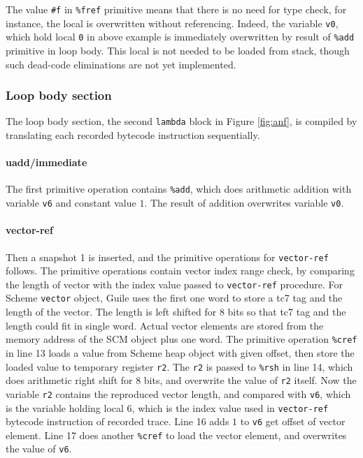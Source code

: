 \documentclass[preprint, 10pt]{sigplanconf}
\begin{document}
The value \texttt{\#f} in \texttt{\%fref} primitive means that there is no need
for type check, for instance, the local is overwritten without
referencing. Indeed, the variable \texttt{v0}, which hold local \texttt{0} in
above example is immediately overwritten by result of \texttt{\%add} primitive
in loop body. This local is not needed to be loaded from stack, though such
dead-code eliminations are not yet implemented.

\subsubsection{Loop body section}

The loop body section, the second \texttt{lambda} block in Figure
\hyperref[fig:anf]{\ref{fig:anf}}, is compiled by translating each recorded
bytecode instruction sequentially.

\paragraph{uadd/immediate} The first primitive operation contains
\texttt{\%add}, which does arithmetic addition with variable \texttt{v6} and
constant value $1$. The result of addition overwrites variable \texttt{v0}.

\paragraph{vector-ref} Then a snapshot 1 is inserted, and
the primitive operations for \texttt{vector-ref} follows. The primitive
operations contain vector index range check, by comparing the length of vector
with the index value passed to \texttt{vector-ref} procedure. For Scheme
\texttt{vector} object, Guile uses the first one word to store a tc7 tag and the
length of the vector. The length is left shifted for 8 bits so that tc7 tag and
the length could fit in single word. Actual vector elements are stored from the
memory address of the SCM object plus one word. The primitive operation
\texttt{\%cref} in line 13 loads a value from Scheme heap object with given
offset, then store the loaded value to temporary register \texttt{r2}. The
\texttt{r2} is passed to \texttt{\%rsh} in line 14, which does arithmetic right
shift for 8 bits, and overwrite the value of \texttt{r2} itself. Now the
variable \texttt{r2} contains the reproduced vector length, and compared with
\texttt{v6}, which is the variable holding local 6, which is the index value
used in \texttt{vector-ref} bytecode instruction of recorded trace. Line 16 adds
$1$ to \texttt{v6} get offset of vector element. Line 17 does another
\texttt{\%cref} to load the vector element, and overwrites the value of
\texttt{v6}.
\end{document}
